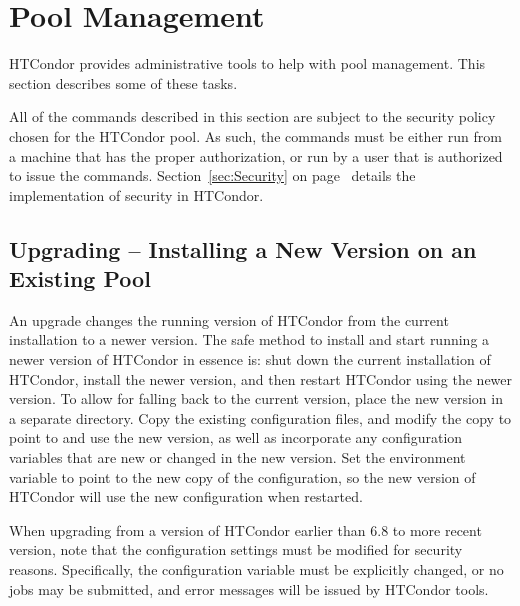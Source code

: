 \section{\label{sec:Pool-Management}Pool Management}

HTCondor provides administrative tools to help with
pool management.
This section describes some of these tasks.

All of the commands described in this section are subject to the
security policy chosen for the HTCondor pool.
As such, the commands must be either run from a
machine that has the proper authorization, 
or run by a user that is authorized to issue the commands.
Section~\ref{sec:Security} on
page~\pageref{sec:Security} details the implementation of 
security in HTCondor.

\subsection{\label{sec:Pool-Upgrade}
Upgrading -- Installing a New Version on an Existing Pool}

An upgrade changes the running version of HTCondor
from the current installation to a newer version.
The safe method
to install and start running a newer version of HTCondor
in essence is:
shut down the current installation of HTCondor,
install the newer version,
and then restart HTCondor using the newer version.
To allow for falling back to the current version,
place the new version in a separate directory.
Copy the existing configuration files,
and modify the copy to point to and use the new version,
as well as incorporate any configuration variables that are new or changed
in the new version.
Set the  environment variable
to point to the new copy of the configuration,
so the new version of HTCondor will use the new configuration when restarted.

When upgrading from a version of HTCondor earlier than 6.8 to more recent version,
note that the configuration settings must be modified for security reasons.
Specifically, the  configuration variable
must be explicitly changed,
or no jobs may be submitted,
and error messages will be issued by HTCondor tools.

